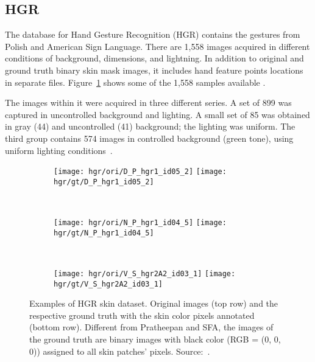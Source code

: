 \subsection{HGR}
\label{sec:datasets_hgr}
The database for Hand Gesture Recognition (HGR) contains the gestures from Polish and American Sign Language. There are 1,558 images acquired in different conditions of background, dimensions, and lightning. In addition to original and ground truth binary skin mask images, it includes hand feature points locations in separate files. Figure~\ref{fig:hgr_dataset_exemplo} shows some of the 1,558 samples available \citep{kawulok:14, nalepa:14, grzejszczak:16}.

The images within it were acquired in three different series. A set of 899 was captured in uncontrolled background and lighting. A small set of 85 was obtained in gray (44) and uncontrolled (41) background; the lighting was uniform. The third group contains 574 images in controlled background (green tone), using uniform lighting conditions~\citep{kawulok:14, nalepa:14, grzejszczak:16}.

\begin{figure}[!hbt]
    \centering
    \begin{subfigure}[t]{0.3\textwidth}
        \texttt{[image: hgr/ori/D\_P\_hgr1\_id05\_2]}
        \texttt{[image: hgr/gt/D\_P\_hgr1\_id05\_2]}
    \end{subfigure}
    ~
    \begin{subfigure}[t]{0.275\textwidth}
        \texttt{[image: hgr/ori/N\_P\_hgr1\_id04\_5]}
        \texttt{[image: hgr/gt/N\_P\_hgr1\_id04\_5]}
    \end{subfigure}
    ~
    \begin{subfigure}[t]{0.337\textwidth}
        \texttt{[image: hgr/ori/V\_S\_hgr2A2\_id03\_1]}
        \texttt{[image: hgr/gt/V\_S\_hgr2A2\_id03\_1]}
    \end{subfigure}
    \caption[Examples of HGR skin dataset]{Examples of HGR skin dataset. Original images (top row) and the respective ground truth with the skin color pixels annotated (bottom row). Different from Pratheepan and SFA, the images of the ground truth are binary images with black color (RGB = (0, 0, 0)) assigned to all skin patches' pixels. Source:~\citet{kawulok:14, nalepa:14, grzejszczak:16}.}
    \label{fig:hgr_dataset_exemplo}
\end{figure}


